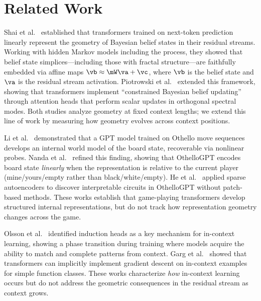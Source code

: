 \section{Related Work}
\label{sec:related}

Shai et al.~\cite{shai2024transformers} established that transformers trained on next-token prediction linearly represent the geometry of Bayesian belief states in their residual streams. Working with hidden Markov models including the \messthree process, they showed that belief state simplices---including those with fractal structure---are faithfully embedded via affine maps $\vb \approx \mW \va + \vc$, where $\vb$ is the belief state and $\va$ is the residual stream activation. Piotrowski et al.~\cite{piotrowski2025constrained} extended this framework, showing that transformers implement ``constrained Bayesian belief updating'' through attention heads that perform scalar updates in orthogonal spectral modes. Both studies analyze geometry at fixed context lengths; we extend this line of work by measuring how geometry evolves across context positions.

Li et al.~\cite{li2023emergent} demonstrated that a GPT model trained on Othello move sequences develops an internal world model of the board state, recoverable via nonlinear probes. Nanda et al.~\cite{nanda2023emergent} refined this finding, showing that OthelloGPT encodes board state \emph{linearly} when the representation is relative to the current player (mine/yours/empty rather than black/white/empty). He et al.~\cite{he2024dictionary} applied sparse autoencoders to discover interpretable circuits in OthelloGPT without patch-based methods. These works establish that game-playing transformers develop structured internal representations, but do not track how representation geometry changes across the game.

Olsson et al.~\cite{olsson2022context} identified induction heads as a key mechanism for in-context learning, showing a phase transition during training where models acquire the ability to match and complete patterns from context. Garg et al.~\cite{garg2022can} showed that transformers can implicitly implement gradient descent on in-context examples for simple function classes. These works characterize \emph{how} in-context learning occurs but do not address the geometric consequences in the residual stream as context grows.

